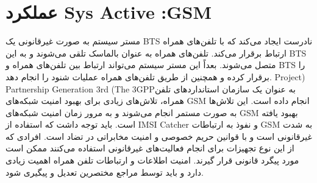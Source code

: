\section{عملکرد Sys Active :GSM}
مستر سیستم به صورت غیرقانونی یک BTS نادرست ایجاد می‌کند که با تلفن‌های همراه ارتباط برقرار می‌کند. تلفن‌های همراه به عنوان بالماسک تلقی می‌شوند و به این BTS متصل می‌شوند.
بعداً این مستر سیستم می‌تواند ارتباط بین تلفن‌های همراه و BTS را برقرار کرده و همچنین از طریق تلفن‌های همراه عملیات شنود را انجام دهد.
Project) Partnership Generation 3rd (The 3GPPبه عنوان یک سازمان استانداردهای تلفن همراه، تلاش‌های زیادی برای بهبود امنیت شبکه‌های GSM انجام داده است. این تلاش‌ها به صورت مستمر انجام می‌شوند و به مرور زمان امنیت شبکه‌های GSM بهبود یافته است.
باید توجه داشت که استفاده از IMSI Catcher و نفوذ به ارتباطات GSM به شدت غیرقانونی است و با قوانین حریم خصوصی و امنیت مخابراتی در تضاد است. افرادی که از این نوع تجهیزات برای انجام فعالیت‌های غیرقانونی استفاده می‌کنند ممکن است مورد پیگرد قانونی قرار گیرند. امنیت اطلاعات و ارتباطات تلفن همراه اهمیت زیادی دارد و باید توسط مراجع مختصرین تعدیل و پیگیری شود.
